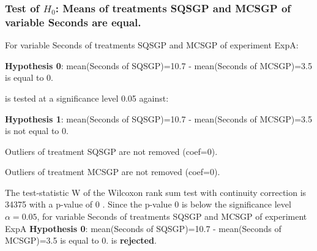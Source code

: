 \begin{frame}[t]
 \frametitle{Test of $H_{0}$: Means of treatments SQSGP and MCSGP of variable Seconds are equal. }
 \scriptsize
 For variable Seconds of treatments SQSGP and MCSGP of experiment ExpA:

\vspace{1mm}
{\bf Hypothesis 0}: mean(Seconds of SQSGP)=10.7 - mean(Seconds of MCSGP)=3.5 is equal to 0.


 \begin{center} is tested at a significance level 0.05 against: \end{center}

{\bf Hypothesis 1}: mean(Seconds of SQSGP)=10.7 - mean(Seconds of MCSGP)=3.5 is not equal to 0.
\vspace{1mm}
\vspace{1mm}

 Outliers of treatment SQSGP  are not removed (coef=0).

 Outliers of treatment MCSGP  are not removed (coef=0).
\vspace{1mm}
 
 The test-statistic W of the Wilcoxon rank sum test with continuity correction is 34375 with a p-value of 0 .
 Since the p-value 0 is below the significance level $\alpha= 0.05 $,
 for variable Seconds of treatments SQSGP and MCSGP of experiment ExpA 
 {\bf Hypothesis 0}: mean(Seconds of SQSGP)=10.7 - mean(Seconds of MCSGP)=3.5 is equal to 0.
is {\bf rejected}.

 \end{frame}
